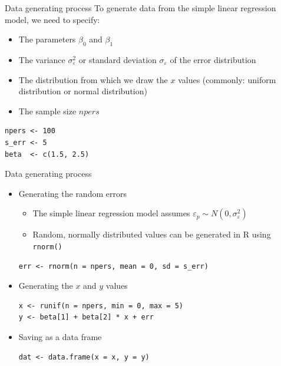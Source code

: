 \documentclass[aspectratio=169]{beamer}
\begin{document}
\begin{frame}[fragile]{Data generating process}
  To generate data from the simple linear regression model, we need to specify:
  \begin{itemize}
    \item The parameters $\beta_0$ and $\beta_1$
    \item The variance $\sigma_{\varepsilon}^2$ or standard deviation
      $\sigma_{\varepsilon}$ of the error distribution
    \item The distribution from which we draw the $x$ values (commonly: uniform
      distribution or normal distribution)
    \item The sample size $npers$
  \end{itemize}
\begin{lstlisting}
npers <- 100
s_err <- 5
beta  <- c(1.5, 2.5)
\end{lstlisting}
\end{frame}

\begin{frame}[fragile]{Data generating process}
  \begin{itemize}
    \item Generating the random errors
      \begin{itemize}
    \item The simple linear regression model assumes $\varepsilon_p \sim N(0,
      \sigma_{\varepsilon}^2)$\\
    \item Random, normally distributed values can be generated in R using
      \texttt{rnorm()}
      \end{itemize}
\begin{lstlisting}
err <- rnorm(n = npers, mean = 0, sd = s_err)
\end{lstlisting}
    \item Generating the $x$ and $y$ values
\begin{lstlisting}
x <- runif(n = npers, min = 0, max = 5)
y <- beta[1] + beta[2] * x + err
\end{lstlisting}
    \item Saving as a data frame
\begin{lstlisting}
dat <- data.frame(x = x, y = y)
\end{lstlisting}
  \end{itemize}
\end{frame}
\end{document}
